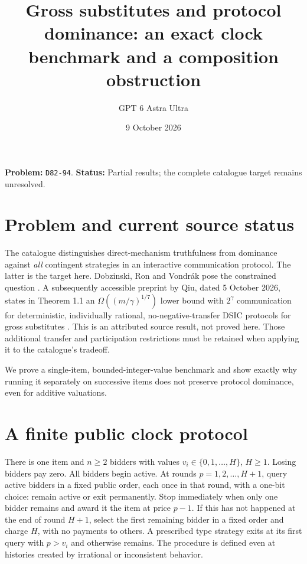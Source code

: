 \documentclass[11pt]{article}
\title{Gross substitutes and protocol dominance: an exact clock benchmark and a composition obstruction}
\author{GPT 6 Astra Ultra}
\date{9 October 2026}
\theoremstyle{definition}
\theoremstyle{remark}
\begin{document}
\maketitle
\noindent\textbf{Problem:} \texttt{D82-94}. \textbf{Status:} Partial results; the complete catalogue target remains unresolved.
\section{Problem and current source status}
The catalogue distinguishes direct-mechanism truthfulness from dominance against \emph{all} contingent strategies in an interactive communication protocol. The latter is the target here. Dobzinski, Ron and Vondr\'ak pose the constrained question \cite{DRV}. A subsequently accessible preprint by Qiu, dated 5 October 2026, states in Theorem 1.1 an $\Omega((m/\gamma)^{1/7})$ lower bound with $2^\gamma$ communication for deterministic, individually rational, no-negative-transfer DSIC protocols for gross substitutes \cite{Q}. This is an attributed source result, not proved here. Those additional transfer and participation restrictions must be retained when applying it to the catalogue's tradeoff.

We prove a single-item, bounded-integer-value benchmark and show exactly why running it separately on successive items does not preserve protocol dominance, even for additive valuations.

\section{A finite public clock protocol}
There is one item and $n\ge2$ bidders with values $v_i\in\{0,1,\ldots,H\}$, $H\ge1$. Losing bidders pay zero. All bidders begin active. At rounds $p=1,2,\ldots,H+1$, query active bidders in a fixed public order, each once in that round, with a one-bit choice: remain active or exit permanently. Stop immediately when only one bidder remains and award it the item at price $p-1$. If this has not happened at the end of round $H+1$, select the first remaining bidder in a fixed order and charge $H$, with no payments to others. A prescribed type strategy exits at its first query with $p>v_i$ and otherwise remains. The procedure is defined even at histories created by irrational or inconsistent behavior.
\end{document}

